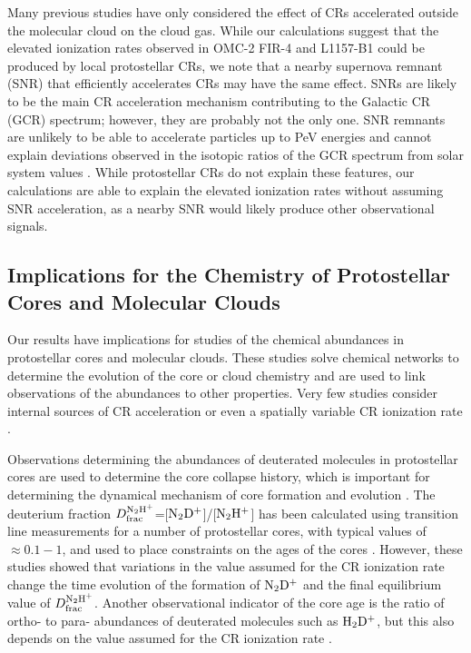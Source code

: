 \documentclass[twocolumn]{aastex63}
\begin{document}
Many previous studies have only considered the effect of CRs accelerated outside the molecular cloud on the cloud gas. While our calculations suggest that the elevated ionization rates observed in OMC-2 FIR-4 and L1157-B1 could be produced by local protostellar CRs, we note that a nearby supernova remnant (SNR) that efficiently accelerates CRs may have the same effect. SNRs are likely to be the main CR acceleration mechanism contributing to the Galactic CR (GCR) spectrum; however, they are probably not the only one. SNR remnants are unlikely to be able to accelerate particles up to PeV energies and cannot explain deviations observed in the isotopic ratios of the GCR spectrum from solar system values \citep{drury_2001_CRs, bykov_2020_acceleration}. While protostellar CRs do not explain these features, our calculations are able to explain the elevated ionization rates without assuming SNR acceleration, as a nearby SNR would likely produce other observational signals.

\subsection{Implications for the Chemistry of Protostellar Cores and Molecular Clouds}

Our results have implications for studies of the chemical abundances in protostellar cores and molecular clouds. These studies solve chemical networks to determine the evolution of the core or cloud chemistry and are used to link observations of the abundances to other properties. Very few studies consider internal sources of CR acceleration or even a spatially variable CR ionization rate \citep{gaches_2019_mc1}. 

Observations determining the abundances of deuterated molecules in protostellar cores are used to determine the core collapse history, which is important for determining the dynamical mechanism of core formation and evolution \citep{bacmann_2003_deuterium, flower_2006_deuterium, caselli_2008_deuterium, emprechtinger_2009_deuterium, fontani_2011_deuterium, kong_2015_deuterium, kong_2016_deuterium}. The deuterium fraction $D_{\rm frac}^{\rm N_2 H^+}$=[$\rm N_2 D^+$]/[$\rm N_2 H^+$] has been calculated using transition line measurements for a number of protostellar cores, with typical values of $\approx 0.1-1$, and used to place constraints on the ages of the cores \citep{crapsi_2005_deuterium, emprechtinger_2009_deuterium, pagani_2009_deuterium, pagani_2013_deuterium, kong_2016_deuterium}. However, these studies showed that variations in the value assumed for the CR ionization rate change the time evolution of the formation of $\rm N_2 D^+$  and the final equilibrium value of $D_{\rm frac}^{\rm N_2 H^+}$. Another observational indicator of the core age is the ratio of ortho- to para- abundances of deuterated molecules such as $\rm H_2 D^+$, but this also depends on the value assumed for the CR ionization rate \citep{caselli_2008_deuterium, brunken_2014_deuterium}. 
\end{document}
